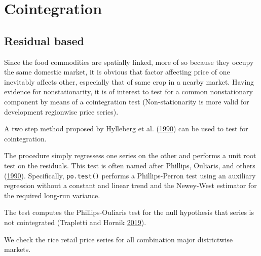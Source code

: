 \documentclass[
  12pt,
]{article}
\begin{document}
\hypertarget{cointegration}{%
\section{Cointegration}\label{cointegration}}

\hypertarget{residual-based}{%
\subsection{Residual based}\label{residual-based}}

Since the food commodities are spatially linked, more of so because they occupy the same domestic market, it is obvious that factor affecting price of one inevitably affects other, especially that of same crop in a nearby market. Having evidence for nonstationarity, it is of interest to test for a common nonstationary component by means of a cointegration test (Non-stationarity is more valid for development regionwise price series).

A two step method proposed by Hylleberg et al. (\protect\hyperlink{ref-hylleberg1990seasonal}{1990}) can be used to test for cointegration.

The procedure simply regressess one series on the other and performs a unit root test on the residuals. This test is often named after Phillips, Ouliaris, and others (\protect\hyperlink{ref-phillips1990asymptotic}{1990}). Specifically, \texttt{po.test()} performs a Phillips-Perron test using an auxiliary regression without a constant and linear trend and the Newey-West estimator for the required long-run variance.

The test computes the Phillips-Ouliaris test for the null hypothesis that series is not cointegrated (Trapletti and Hornik \protect\hyperlink{ref-R-tseries}{2019}).

We check the rice retail price series for all combination major districtwise markets.
\end{document}
